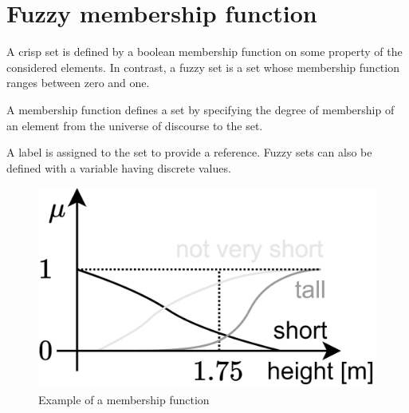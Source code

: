 \section{Fuzzy membership function}

A crisp set is defined by a boolean membership function on some property of the considered elements. 
In contrast, a fuzzy set is a set whose membership function ranges between zero and one.
\begin{definition}
    A membership function defines a set by specifying the degree of membership of an element from the universe of discourse to the set. 
\end{definition}
A label is assigned to the set to provide a reference. 
Fuzzy sets can also be defined with a variable having discrete values.
\begin{figure}[H]
    \centering
    \includegraphics[width=0.3\linewidth]{images/function.png}
    \caption{Example of a membership function}
\end{figure}

